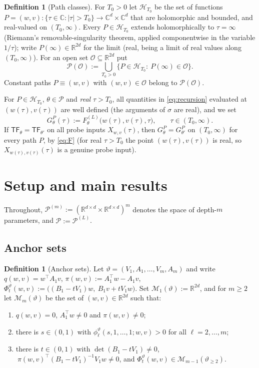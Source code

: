 \documentclass[11pt]{article}
\theoremstyle{definition}
\newtheorem{definition}[theorem]{Definition}
\theoremstyle{remark}
\theoremstyle{plain}
\newcommand{\R}{\mathbb{R}}
\newcommand{\C}{\mathbb{C}}
\newcommand{\cO}{\mathcal{O}}
\newcommand{\cP}{\mathcal{P}}
\newcommand{\cM}{\mathcal{M}}
\newcommand{\cH}{\mathcal{H}}
\newcommand{\sig}{\sigma}
\newcommand{\TF}{\mathsf{TF}}
\begin{document}
\begin{definition}[Path classes]\label{def:paths}
For $T_0>0$ let $\cH_{T_0}$ be the set of functions
$P=(w,v):\{\tau\in\C:|\tau|>T_0\}\to\C^d\times\C^d$ that are holomorphic and bounded, and
real-valued on $(T_0,\infty)$.  Every $P\in\cH_{T_0}$ extends holomorphically to
$\tau=\infty$ (Riemann's removable-singularity theorem, applied componentwise in the
variable $1/\tau$); write $P(\infty)\in\R^{2d}$ for the limit (real, being a limit of real
values along $(T_0,\infty)$).  For an open set $\cO\subseteq\R^{2d}$ put
\[
\cP(\cO):=\bigcup_{T_0>0}\big\{P\in\cH_{T_0}:\ P(\infty)\in\cO\big\}.
\]
Constant paths $P\equiv(w,v)$ with $(w,v)\in\cO$ belong to $\cP(\cO)$.
\end{definition}

For $P\in\cH_{T_0}$, $\theta\in\cP$ and \emph{real} $\tau>T_0$, all quantities in
\eqref{eq:recursion} evaluated at $(w(\tau),v(\tau))$ are well defined (the arguments of
$\sig$ are real), and we set
\[
G^P_\theta(\tau):=F^{(L)}_\theta\big(w(\tau),v(\tau),\tau\big),\qquad \tau\in(T_0,\infty).
\]
If $\TF_\theta=\TF_{\theta'}$ on all probe inputs $X_{w,v}(\tau)$, then
$G^P_\theta=G^P_{\theta'}$ on $(T_0,\infty)$ for every path $P$, by \eqref{eq:F} (for real
$\tau>T_0$ the point $(w(\tau),v(\tau))$ is real, so $X_{w(\tau),v(\tau)}(\tau)$ is a
genuine probe input).

\section{Setup and main results}\label{sec:statements}

Throughout, $\cP^{(m)}:=(\R^{d\times d}\times\R^{d\times d})^m$ denotes the space of
depth-$m$ parameters, and $\cP:=\cP^{(L)}$.

\subsection{Anchor sets}

\begin{definition}[Anchor sets]\label{def:anchor}
Let $\vartheta=(V_1,A_1,\dots,V_m,A_m)$ and write $q(w,v)=w^\top A_1v$,
$\pi(w,v):=A_1^\top w-A_1v$, $\Phi^\vartheta_t(w,v):=\big((B_1-tV_1)w,\ B_1v+tV_1w\big)$.
Set $\cM_1(\vartheta):=\R^{2d}$, and for $m\ge2$ let $\cM_m(\vartheta)$ be the set of
$(w,v)\in\R^{2d}$ such that:
\begin{enumerate}
\item[(M1)] $q(w,v)=0$, $A_1^\top w\neq0$ and $\pi(w,v)\neq0$;
\item[(M2)] there is $s\in(0,1)$ with $\phi^\vartheta_\ell(s,1,\dots,1;w,v)>0$ for all
$\ell=2,\dots,m$;
\item[(M3)] there is $t\in(0,1)$ with $\det(B_1-tV_1)\neq0$,
$\ \pi(w,v)^\top(B_1-tV_1)^{-1}V_1w\neq0$, and
$\Phi^\vartheta_t(w,v)\in\cM_{m-1}(\vartheta_{\ge2})$.
\end{enumerate}
\end{definition}
\end{document}
